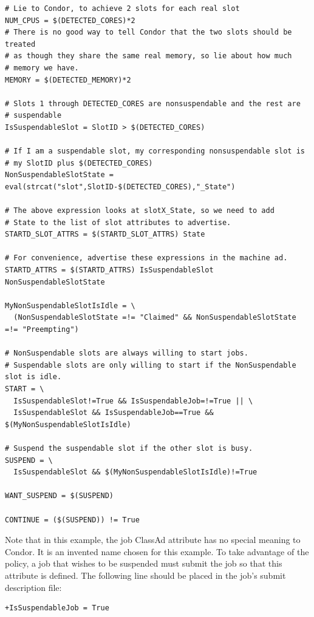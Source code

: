 \footnotesize
\begin{verbatim}
# Lie to Condor, to achieve 2 slots for each real slot
NUM_CPUS = $(DETECTED_CORES)*2
# There is no good way to tell Condor that the two slots should be treated
# as though they share the same real memory, so lie about how much
# memory we have.
MEMORY = $(DETECTED_MEMORY)*2

# Slots 1 through DETECTED_CORES are nonsuspendable and the rest are
# suspendable
IsSuspendableSlot = SlotID > $(DETECTED_CORES)

# If I am a suspendable slot, my corresponding nonsuspendable slot is
# my SlotID plus $(DETECTED_CORES)
NonSuspendableSlotState = eval(strcat("slot",SlotID-$(DETECTED_CORES),"_State")

# The above expression looks at slotX_State, so we need to add
# State to the list of slot attributes to advertise.
STARTD_SLOT_ATTRS = $(STARTD_SLOT_ATTRS) State

# For convenience, advertise these expressions in the machine ad.
STARTD_ATTRS = $(STARTD_ATTRS) IsSuspendableSlot NonSuspendableSlotState

MyNonSuspendableSlotIsIdle = \
  (NonSuspendableSlotState =!= "Claimed" && NonSuspendableSlotState =!= "Preempting")

# NonSuspendable slots are always willing to start jobs.
# Suspendable slots are only willing to start if the NonSuspendable slot is idle.
START = \
  IsSuspendableSlot!=True && IsSuspendableJob=!=True || \
  IsSuspendableSlot && IsSuspendableJob==True && $(MyNonSuspendableSlotIsIdle)

# Suspend the suspendable slot if the other slot is busy.
SUSPEND = \
  IsSuspendableSlot && $(MyNonSuspendableSlotIsIdle)!=True

WANT_SUSPEND = $(SUSPEND)

CONTINUE = ($(SUSPEND)) != True

\end{verbatim}
\normalsize

Note that in this example, the job ClassAd attribute 
has no special meaning to Condor.  It is an invented name chosen
for this example.
To take advantage of the policy, a job that wishes to be suspended
must submit the job so that this attribute is defined.
The following line should be placed in the job's submit description file:
\begin{verbatim}
+IsSuspendableJob = True
\end{verbatim}
